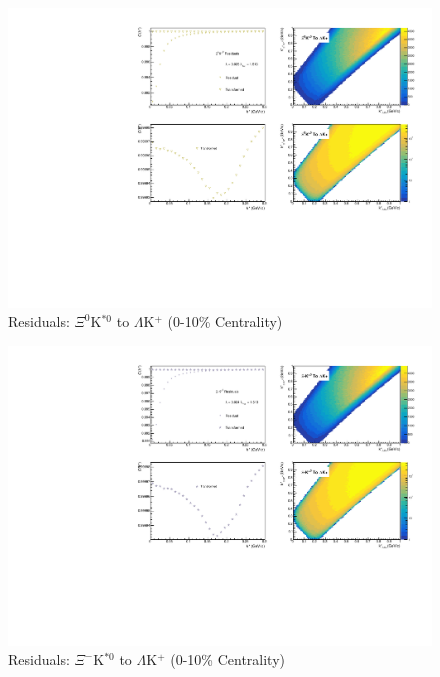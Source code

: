 \documentclass[/home/jesse/Analysis/FemtoAnalysis/AnalysisNotes/AnalysisNoteJBuxton.tex]{subfiles}
\begin{document}
\begin{figure}[h]
  \centering
  \includegraphics[width=\textwidth]{9_AdditionalFigures/Figures/Residuals/LamKchP/Residuals_LamKchP_0010_Xi0KSt0_MomResCrctn_NonFlatBgdCrctn_10Res_PrimMaxDecay4fm_UsingXiDataAndCoulombOnly.pdf}
  \caption[Residuals: $\Xi^{0}$K$^{*0}$ to $\Lambda$K$^{+}$ (0-10\% Centrality)]{Residuals: $\Xi^{0}$K$^{*0}$ to $\Lambda$K$^{+}$ (0-10\% Centrality)}
  \label{fig:Res_LamKchP_0010_Xi0KSt0}
\end{figure}

\begin{figure}[h]
  \centering
  \includegraphics[width=\textwidth]{9_AdditionalFigures/Figures/Residuals/LamKchP/Residuals_LamKchP_0010_XiKSt0_MomResCrctn_NonFlatBgdCrctn_10Res_PrimMaxDecay4fm_UsingXiDataAndCoulombOnly.pdf}
  \caption[Residuals: $\Xi^{-}$K$^{*0}$ to $\Lambda$K$^{+}$ (0-10\% Centrality)]{Residuals: $\Xi^{-}$K$^{*0}$ to $\Lambda$K$^{+}$ (0-10\% Centrality)}
  \label{fig:Res_LamKchP_0010_XiCKSt0}
\end{figure}
\end{document}
